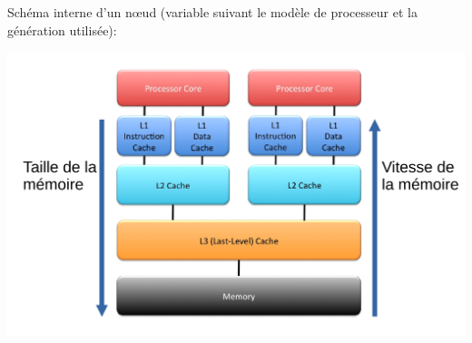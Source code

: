 \documentclass{beamer}
\begin{document}
\begin{frame}
Schéma interne d'un n\oe ud (variable suivant le mod\`ele de processeur et la g\'en\'eration utilis\'ee):

\begin{center}
\includegraphics[scale=0.32]{../Images/NoeudCalcul}
\end{center}

\end{frame}
\end{document}
